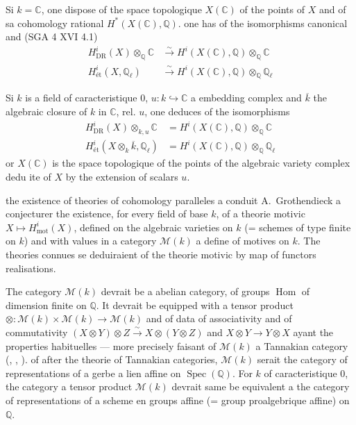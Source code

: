 \documentclass[12pt,a4paper]{article}
\theoremstyle{plain}
\theoremstyle{definition}
\theoremstyle{remark}
\DeclareMathOperator{\Spec}{Spec}
\DeclareMathOperator{\Hom}{Hom}
\newcommand{\mot}{\mathrm{mot}}
\providecommand{\Hom}{\operatorname{Hom}}
\providecommand{\Spec}{\operatorname{Spec}}
\providecommand{\mot}{\mathrm{mot}}
\providecommand{\DR}{\mathrm{DR}}
\begin{document}
Si $k = \mathbb{C}$, one dispose of the space topologique $X(\mathbb{C})$ of the points of $X$
and of sa cohomology rational $H^*(X(\mathbb{C}), \mathbb{Q})$. one has of the isomorphisms
canonical \cite{G} and (SGA 4 XVI 4.1)
\begin{align}
H^i_{\DR}(X) \otimes_{\mathbb{Q}} \mathbb{C} &\xrightarrow{\sim} H^i(X(\mathbb{C}), \mathbb{Q}) \otimes_{\mathbb{Q}} \mathbb{C} \label{eq:1.1.1} \\
H^i_\text{\'et}(X, \mathbb{Q}_\ell) &\xrightarrow{\sim} H^i(X(\mathbb{C}), \mathbb{Q}) \otimes_{\mathbb{Q}} \mathbb{Q}_\ell \label{eq:1.1.2}
\end{align}

Si $k$ is a field of caracteristique $0$, $u: k \hookrightarrow \mathbb{C}$ a embedding
complex and $\overline{k}$ the algebraic closure of $k$ in $\mathbb{C}$, rel. $u$, one deduces of the isomorphisms
\begin{align}
H^i_{\DR}(X) \otimes_{k,u} \mathbb{C} &= H^i(X(\mathbb{C}), \mathbb{Q}) \otimes_{\mathbb{Q}} \mathbb{C} \label{eq:1.1.3} \\
H^i_\text{\'et}(X \otimes_k \overline{k}, \mathbb{Q}_\ell) &= H^i(X(\mathbb{C}), \mathbb{Q}) \otimes_{\mathbb{Q}} \mathbb{Q}_\ell \label{eq:1.1.4}
\end{align}
or $X(\mathbb{C})$ is the space topologique of the points of the algebraic variety
complex dedu ite of $X$ by the extension of scalars $u$.

the existence of theories of cohomology paralleles a conduit A.~Grothendieck a
conjecturer the existence, for every field of base $k$, of a theorie motivic
$X \mapsto H^i_\mot(X)$, defined on the algebraic varieties on $k$ (= schemes
of type finite on $k$) and with values in a category $\mathcal{M}(k)$ a define of
motives on $k$. The theories connues se deduiraient of the theorie motivic by
map of functors realisations.

The category $\mathcal{M}(k)$ devrait be a abelian category, of groups $\Hom$
of dimension finite on $\mathbb{Q}$. It devrait be equipped with a tensor product
$\otimes: \mathcal{M}(k) \times \mathcal{M}(k) \to \mathcal{M}(k)$ and of data
of associativity and of commutativity $(X \otimes Y) \otimes Z \xrightarrow{\sim}
X \otimes (Y \otimes Z)$ and $X \otimes Y \to Y \otimes X$ ayant the properties
habituelles --- more precisely faisant of $\mathcal{M}(k)$ a Tannakian category
(\cite{S}, \cite{DM}, \cite{D4}). of after the theorie of Tannakian categories,
$\mathcal{M}(k)$ serait the category of representations of a gerbe a lien affine on
$\Spec(\mathbb{Q})$. For $k$ of caracteristique $0$, the category a tensor product
$\mathcal{M}(k)$ devrait same be equivalent a the category of representations
of a scheme en groups affine (= group proalgebrique affine) on $\mathbb{Q}$.
\end{document}
